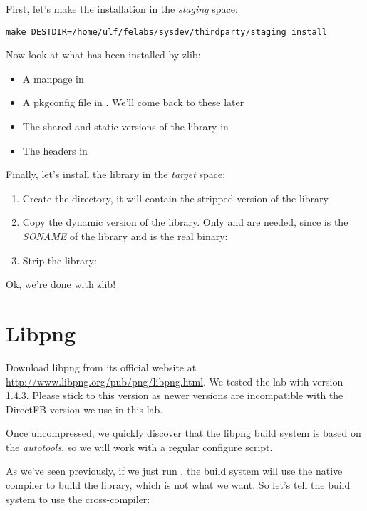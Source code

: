 First, let's make the installation in the {\em staging} space:
\begin{verbatim}
make DESTDIR=/home/ulf/felabs/sysdev/thirdparty/staging install
\end{verbatim}

Now look at what has been installed by zlib:
\begin{itemize}
\item A manpage in 
\item A pkgconfig file in . We'll come back to these
  later
\item The shared and static versions of the library in 
\item The headers in 
\end{itemize}

Finally, let's install the library in the {\em target} space:

\begin{enumerate}
\item Create the  directory, it will contain the
  stripped version of the library
\item Copy the dynamic version of the library. Only  and  are needed, since  is the {\em SONAME} of the library and  is the real binary:\\
\item Strip the library:\\
\end{enumerate}

Ok, we're done with zlib!
\clearpage

\section{Libpng}

Download libpng from its official website at
\url{http://www.libpng.org/pub/png/libpng.html}. We tested the lab
with version 1.4.3. Please stick to this version as newer versions are
incompatible with the DirectFB version we use in this lab.

Once uncompressed, we quickly discover that the libpng build system is
based on the {\em autotools}, so we will work with a regular configure
script.

As we've seen previously, if we just run , the build
system will use the native compiler to build the library, which is not
what we want. So let's tell the build system to use the
cross-compiler:

